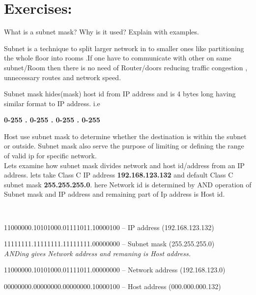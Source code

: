 \documentclass[a4paper,11pt]{article}
\begin{document}
\pagebreak
\section{Exercises:}
\begin{Q}
      {
            What is a subnet mask? Why is it used? Explain with examples.
      }
\end{Q}

\begin{A}
      {
      Subnet is a technique to split larger network in to smaller ones like partitioning the whole floor into rooms .If one have to communicate with other on same subnet/Room then  there is no need of Router/doors reducing traffic congestion , unnecessary routes and network speed.

      Subnet mask hides(mask) host id from IP address and is 4 bytes long having similar format to IP address. i.e

      \begin{center}
            \textbf{0-255 . 0-255 . 0-255 . 0-255}
      \end{center}

      Host use subnet mask to determine whether the destination is within the subnet or outside. Subnet mask also serve the purpose of limiting or defining the range of valid ip for specific network.\\

      Lets examine how subnet mask divides network and host id/address from an IP address.
      lets take Class C IP address \textbf{192.168.123.132} and default Class C subnet mask \textbf{255.255.255.0}. here Network id is determined by AND operation of Subnet mask and IP address and remaining part of Ip address is Host id.

      \HRule\\

      {\bfseries

      11000000.10101000.01111011.10000100 -- IP address (192.168.123.132)

      11111111.11111111.11111111.00000000 -- Subnet mask (255.255.255.0)\\


      \textit{ANDing gives Network address and remaning is Host address.\\}


      11000000.10101000.01111011.00000000 -- Network address (192.168.123.0)

      00000000.00000000.00000000.10000100 -- Host address (000.000.000.132)}

      \HRule\\
      }
\end{A}
\end{document}
